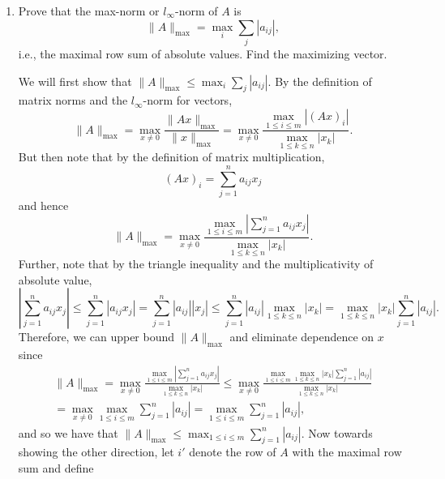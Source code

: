 \documentclass{../../../kin_math}
\begin{document}
\begin{questions}
\begin{enumerate}
    \item Prove that the max-norm or $l_\infty$-norm of $A$ is
    \begin{equation*}
      \lVert A \rVert_\text{max} = \max_i \sum_j |a_{ij}|,
    \end{equation*}
    i.e., the maximal row sum of absolute values. Find the maximizing vector.
    \begin{solution}
      We will first show that $\lVert A \rVert_\text{max} \leq \max_i \sum_j |a_{ij}|$. By the definition of matrix norms and the $l_\infty$-norm for vectors,
      \begin{equation*}
        \lVert A \rVert_\text{max} = \max_{x \neq 0} \frac{\lVert Ax \rVert_\text{max}}{\lVert x \rVert_\text{max}} = \max_{x \neq 0} \frac{\max_{1 \leq i \leq m} |(Ax)_i|}{\max_{1 \leq k \leq n} |x_k|}.
      \end{equation*}
      But then note that by the definition of matrix multiplication,
      \begin{equation*}
        (Ax)_i = \sum_{j = 1}^n a_{ij}x_j
      \end{equation*}
      and hence
      \begin{equation*}
        \lVert A \rVert_\text{max} = \max_{x \neq 0} \frac{\max_{1 \leq i \leq m} \left|\sum_{j = 1}^n a_{ij}x_j\right|}{\max_{1 \leq k \leq n} |x_k|}.
      \end{equation*}
      Further, note that by the triangle inequality and the multiplicativity of absolute value,
      \begin{equation*}
        \left|\sum_{j = 1}^n a_{ij}x_j\right| \leq \sum_{j = 1}^n |a_{ij}x_j| = \sum_{j = 1}^n |a_{ij}||x_j| \leq \sum_{j = 1}^n |a_{ij}| \max_{1 \leq k \leq n} |x_k| = \max_{1 \leq k \leq n} |x_k| \sum_{j = 1}^n |a_{ij}|.
      \end{equation*}
      Therefore, we can upper bound $\lVert A \rVert_\text{max}$ and eliminate dependence on $x$ since
      \begin{multline*}
        \lVert A \rVert_\text{max} = \max_{x \neq 0} \frac{\max_{1 \leq i \leq m} \left|\sum_{j = 1}^n a_{ij}x_j\right|}{\max_{1 \leq k \leq n} |x_k|} \leq \max_{x \neq 0} \frac{\max_{1 \leq i \leq m} \max_{1 \leq k \leq n} |x_k| \sum_{j = 1}^n |a_{ij}|}{\max_{1 \leq k \leq n} |x_k|} \\
        = \max_{x \neq 0} \max_{1 \leq i \leq m} \sum_{j = 1}^n |a_{ij}| = \max_{1 \leq i \leq m} \sum_{j = 1}^n |a_{ij}|,
      \end{multline*}
      and so we have that $\lVert A \rVert_\text{max} \leq \max_{1 \leq i \leq m} \sum_{j = 1}^n |a_{ij}|$. Now towards showing the other direction, let $i'$ denote the row of $A$ with the maximal row sum and define

\end{solution}
\end{enumerate}
\end{questions}
\end{document}
